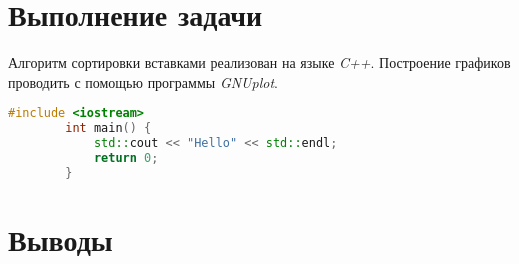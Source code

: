 \documentclass[12pt, a4paper]{report}
\begin{document}
	\section*{Выполнение задачи}
	Алгоритм сортировки вставками реализован на языке \textit{C++}. Построение графиков проводить с помощью программы \textit{GNUplot}.
	\lstset{style=mystyle}
	\begin{lstlisting}[language=C++]
		#include <iostream>
		int main() {
			std::cout << "Hello" << std::endl;
			return 0;
		}
	\end{lstlisting}

	\section*{Выводы}
		
\end{document}
